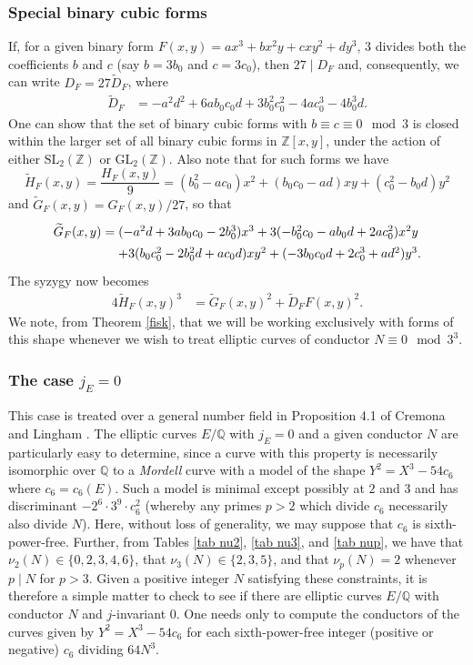 \documentclass[11pt]{report}
\theoremstyle{definition}
\begin{document}
\subsubsection{Special binary cubic forms} \label{dahlia}
If, for a given binary form $F(x,y)=a x^3 + b x^2 y + c xy^2 + d y^3$, 3 divides both the coefficients $b$ and $c$ (say $b = 3 b_0$ and
$c=3 c_0$), then  $27 \mid D_F$ and, consequently, we can write $D_F=27 \widetilde{D}_F$, where
\begin{align*}
\widetilde{D}_F &= -a^2d^2+6ab_0c_0d+3b_0^2c_0^2-4ac_0^3-4b_0^3d.
\end{align*}
One can show that the set of binary cubic forms with $b \equiv c \equiv 0 \mod{3}$ is closed within the larger set of all binary
cubic forms in $\mathbb{Z}[x,y]$, under the action of either $\mbox{SL}_2 ( \mathbb{Z})$ or $\mbox{GL}_2 ( \mathbb{Z})$.
Also note that for such forms we have
$$
 \widetilde{H}_F(x,y) = \frac{H_F(x,y)}{9}= (b_0^2-ac_0) x^2 + (b_0c_0-ad) xy + (c_0^2-b_0d) y^2
$$
and $\widetilde{G}_F (x,y) =  G_F(x,y)/27$, so that
$$
\arraycolsep=1.4pt\def\arraystretch{1.4}
\begin{array}{cl}
\widetilde{G}_F (x,y) = & (-a^2d+3ab_0c_0-2b_0^3) x^3 + 3 (-b_0^2c_0-ab_0d+2ac_0^2) x^2 y \\
 & + 3 (b_0c_0^2-2b_0^2d+ac_0d) x y^2 + (-3b_0c_0d+2c_0^3+ad^2) y^3. \\
 \end{array}
$$
The syzygy now becomes
\begin{align} \label{syz2}
4\widetilde{H}_F (x,y)^3 &=\widetilde{G}_F(x,y)^2+\widetilde{D}_F F(x,y)^2.
\end{align}
We note, from Theorem \ref{fisk}, that we will be working exclusively with forms of this shape whenever we wish to treat elliptic curves of conductor $N \equiv 0 \mod{3^3}$.

\subsubsection{The case $j_E = 0$} \label{Mordell}
This case is treated over a general number field in Proposition 4.1 of Cremona and Lingham \cite{CrLi}.
The elliptic curves $E/\mathbb{Q}$ with $j_E=0$ and a given conductor $N$ are particularly easy to determine, since a curve with this property is necessarily isomorphic over $\mathbb{Q}$ to a {\it Mordell} curve with a model of the shape $Y^2 = X^3  - 54 c_6$ where $c_6=c_6(E)$. Such a model is minimal except possibly at $2$ and $3$ and has discriminant
$-2^6 \cdot 3^9 \cdot c_6^2$ (whereby any primes $p > 2$ which divide $c_6$  necessarily also divide $N$). Here, without loss of generality, we may suppose that $c_6$ is sixth-power-free.
Further, from Tables \ref{tab nu2}, \ref{tab nu3}, and \ref{tab nup}, we have that $\nu_2(N) \in \{ 0, 2, 3, 4, 6 \}$, that $\nu_3 (N) \in \{ 2, 3, 5 \}$, and that $\nu_p(N)=2$ whenever $p \mid N$ for $p > 3$. Given a positive integer $N$ satisfying these constraints, it is therefore a simple matter to check to see if there are elliptic curves $E/\mathbb{Q}$ with conductor $N$ and $j$-invariant $0$. One needs only to compute the conductors of the curves given by $Y^2 = X^3  - 54 c_6$ for each sixth-power-free integer (positive or negative) $c_6$ dividing $64 N^3$.
\end{document}

